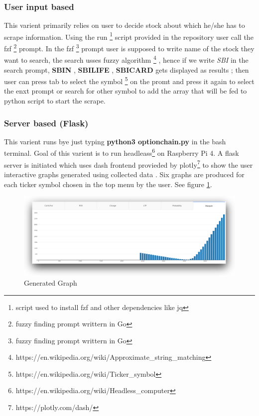 \begin{multicols}{2}

\hypertarget{user-input-based}{%
\subsubsection{User input based}\label{user-input-based}}

This varient primarily relies on user to decide stock about which he/she
has to scrape information. Using the run \footnote{script used to
  install fzf and other dependencies like jq} script provided in the
repository user call the fzf \footnote{fuzzy finding prompt writtern in
  Go} prompt. In the fzf \footnote{fuzzy finding prompt writtern in Go}
prompt user is supposed to write name of the stock they want to search,
the search usses fuzzy algorithm \footnote{https://en.wikipedia.org/wiki/Approximate\_string\_matching}
, hence if we write \emph{SBI} in the search prompt, \textbf{SBIN} ,
\textbf{SBILIFE} , \textbf{SBICARD} gets displayed as results ; then
user can press tab to select the symbol \footnote{https://en.wikipedia.org/wiki/Ticker\_symbol}
on the promt and press it again to select the enxt prompt or search for
other symbol to add the array that will be fed to python script to start
the scrape.

\hypertarget{server-based-flask}{%
\subsubsection{Server based (Flask)}\label{server-based-flask}}

This varient runs bye just typing \textbf{python3 optionchain.py} in the
bash terminal. Goal of this varient is to run headleass\footnote{https://en.wikipedia.org/wiki/Headless\_computer}
on Raspberry Pi 4. A flask server is initiated which uses dash frontend
provieded by plotly\footnote{https://plotly.com/dash/} to show the user
interactive graphs generated using collected data . Six graphs are
produced for each ticker symbol chosen in the top menu by the user. See
figure \ref{mylabel}.

\end{multicols}

\begin{figure}
\centering
\includegraphics{main.png}
\caption{Generated Graph \label{mylabel}}
\end{figure}

